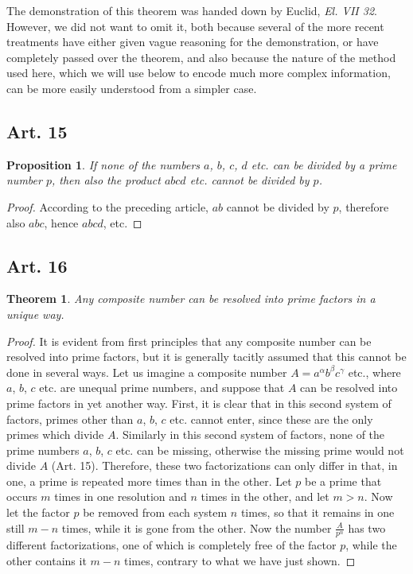 \documentclass{book}
\theoremstyle{plain}
\newtheorem{theorem}{Theorem}
\newtheorem{proposition}{Proposition}
\theoremstyle{remark}
\begin{document}
The demonstration of this theorem was handed down by Euclid, \textit{El. VII 32}.  However, we did not want to omit it, both because several of the more recent treatments have either given vague reasoning for the demonstration, or have completely passed over the theorem, and also because the nature of the method used here, which we will use below to encode much more complex information, can be more easily understood from a simpler case.

\subsection*{Art. 15} 

\begin{proposition} If none of the numbers $a$, $b$, $c$, $d$ etc. can be divided by a prime number $p$, then also the product $abcd$ etc. cannot be divided by $p$. \end{proposition}
\begin{proof} According to the preceding article, $ab$ cannot be divided by $p$, therefore also $abc$, hence $abcd$, etc. \end{proof}

\subsection*{Art. 16}

\begin{theorem} Any composite number can be resolved into prime factors in a unique way. \end{theorem}
\begin{proof} It is evident from first principles that any composite number can be resolved into prime factors, but it is generally tacitly assumed that this cannot be done in several ways.  Let us imagine a composite number $A = a^{\alpha} b^{\beta} c^{\gamma}$ etc., where $a$, $b$, $c$ etc. are unequal prime numbers, and suppose that $A$ can be resolved into prime factors in yet another way.  First, it is clear that in this second system of factors, primes other than $a$, $b$, $c$ etc. cannot enter, since these are the only primes which divide $A$.  Similarly in this second system of factors, none of the prime numbers $a$, $b$, $c$ etc. can be missing, otherwise the missing prime would not divide $A$ (Art. 15).   Therefore, these two factorizations can only differ in that, in one, a prime is repeated more times than in the other. Let $p$ be a prime that occurs $m$ times in one resolution and $n$ times in the other, and let $m>n$.  Now let the factor $p$ be removed from each system $n$ times, so that it remains in one still $m-n$ times, while it is gone from the other.  Now the number $\frac{A}{p^n}$ has two different factorizations, one of which is completely free of the factor $p$, while the other contains it $m-n$ times, contrary to what we have just shown. \end{proof}
\end{document}

